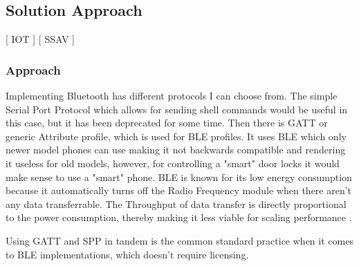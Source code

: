 \subsection{Solution Approach}
[ IOT ] [ SSAV ] 
\newline
\subsubsection{\textbf{Approach}}
 Implementing Bluetooth has different protocols I can choose from.  The simple Serial Port Protocol which allows for sending shell commands would be useful in this case, but it has been deprecated for some time. Then there is GATT \cite{BluetoothTechnologyWebsite_2023} or generic Attribute profile, which is used for BLE profiles. It uses BLE which only newer model phones can use making it not backwards compatible and rendering it useless for old models, however, for controlling a "smart" door locks it would make sense to use a "smart" phone. BLE is known for its low energy consumption because it automatically turns off the Radio Frequency module when there aren't any data transferrable. The Throughput of data transfer is directly proportional to the power consumption, thereby making it less viable for scaling performance 
 \cite{Tosi_Taffoni_Santacatterina_Sannino_Formica_2017}.
 
 Using GATT and SPP in tandem is the common standard practice when it comes to BLE implementations, which doesn't require licensing. 
 